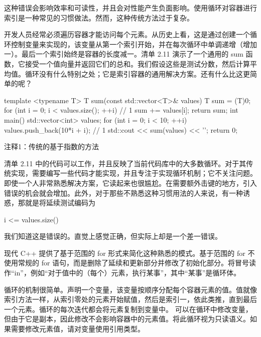 这种错误会影响效率和可读性，并且会对性能产生负面影响。使用循环对容器进行索引是一种常见的习惯做法。然而，这种传统方法过于复杂。


开发人员经常必须遍历容器才能访问每个元素。从历史上看，这是通过创建一个循环控制变量来实现的，该变量从第一个索引开始，并在每次循环中单调递增（增加一）。最后一个索引始终是容器的长度减一。清单 2.11 演示了一个通用的 sum 函数，它接受一个值向量并返回它们的总和。我们假设这些是测试分数，然后计算平均值。循环没有什么特别之处；它是索引容器的通用解决方案。还有什么比这更简单的呢？


\begin{cpp}
template <typename T>
T sum(const std::vector<T>& values) {
  T sum = (T)0;
  for (int i = 0; i < values.size(); ++i) // 1
    sum += values[i];
  return sum;
}
int main() {
  std::vector<int> values;
  for (int i = 0; i < 10; ++i)
    values.push_back(10*i + i); // 1
  std::cout << sum(values) << '\n';
  return 0;
}
\end{cpp}

{\footnotesize
注释1：传统的基于指数的方法
}


清单 2.11 中的代码可以工作，并且反映了当前代码库中的大多数循环。对于其传统实现，需要编写一些代码才能实现，并且专注于实现循环机制；它不关注问题。即使一个人非常熟悉解决方案，它读起来也很尴尬。在需要额外击键的地方，引入错误的机会就会增加。此外，对于那些不熟悉这种习惯用法的人来说，有一种诱惑，那就是将延续测试编码为

\begin{cpp}
i <= values.size()
\end{cpp}

我们知道这是错误的。直觉上感觉正确，但实际上却是一个差一错误。


现代 C++ 提供了基于范围的 for 形式来简化这种熟悉的模式。基于范围的 for 不使用常规的 for 语句，而是删除了延续和更新部分并修改了初始化部分。将冒号读作“in”，例如“对于值中的（每个）元素，执行某事”，其中“某事”是循环体。

循环的机制很简单。声明一个变量，该变量按顺序分配每个容器元素的值。值就像索引方法一样，从索引零处的元素开始赋值，然后是索引一，依此类推，直到最后一个元素。循环的每次迭代都会将元素复制到变量中。
可以在循环中修改变量，但由于它是副本，因此修改不会影响容器中的元素值。将此循环视为只读语义。如果需要修改元素值，请对变量使用引用类型。

